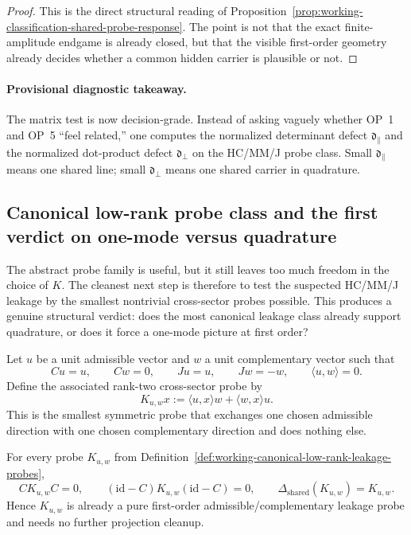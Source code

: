 \begin{proof}
This is the direct structural reading of Proposition~\ref{prop:working-classification-shared-probe-response}. The point is not that the exact finite-amplitude endgame is already closed, but that the visible first-order geometry already decides whether a common hidden carrier is plausible or not.
\end{proof}

\paragraph{Provisional diagnostic takeaway.}
The matrix test is now decision-grade. Instead of asking vaguely whether OP~1 and OP~5 ``feel related,'' one computes the normalized determinant defect $\mathfrak d_{\parallel}$ and the normalized dot-product defect $\mathfrak d_{\perp}$ on the HC/MM/J probe class. Small $\mathfrak d_{\parallel}$ means one shared line; small $\mathfrak d_{\perp}$ means one shared carrier in quadrature.


\subsection*{Canonical low-rank probe class and the first verdict on one-mode versus quadrature}
The abstract probe family is useful, but it still leaves too much freedom in the choice of $K$. The cleanest next step is therefore to test the suspected HC/MM/J leakage by the smallest nontrivial cross-sector probes possible. This produces a genuine structural verdict: does the most canonical leakage class already support quadrature, or does it force a one-mode picture at first order?

\begin{definition}
\label{def:working-canonical-low-rank-leakage-probes}
Let $u$ be a unit admissible vector and $w$ a unit complementary vector such that
\[
 Cu=u,
 \qquad
 Cw=0,
 \qquad
 Ju=u,
 \qquad
 Jw=-w,
 \qquad
 \langle u,w\rangle=0.
\]
Define the associated rank-two cross-sector probe by
\[
 K_{u,w}x
 :=
 \langle u,x\rangle w + \langle w,x\rangle u.
\]
This is the smallest symmetric probe that exchanges one chosen admissible direction with one chosen complementary direction and does nothing else.
\end{definition}

\begin{proposition}
\label{prop:working-exact-support-canonical-low-rank-probes}
For every probe $K_{u,w}$ from Definition~\ref{def:working-canonical-low-rank-leakage-probes},
\[
 CK_{u,w}C=0,
 \qquad
 (\mathrm{id}-C)K_{u,w}(\mathrm{id}-C)=0,
 \qquad
 \Delta_{\mathrm{shared}}(K_{u,w})=K_{u,w}.
\]
Hence $K_{u,w}$ is already a pure first-order admissible/complementary leakage probe and needs no further projection cleanup.
\end{proposition}

